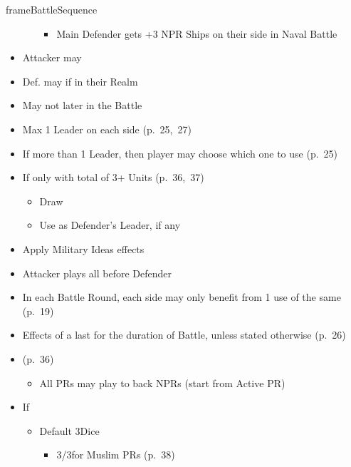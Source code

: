 \documentclass[10pt]{article}
\begin{document}
\begin{dynamiccontents*}{frameBattleSequence}
\begin{multicols}{3}
\begin{itemize}
\begin{itemize}
{				\begin{itemize}
					\item Main Defender gets +3 NPR Ships on their side in Naval Battle
				\end{itemize}
				}
			\end{itemize}
			\item Attacker may 
			\item Def. may  if in their Realm
			\item May not  later in the Battle
			\item Max 1 Leader on each side (p.~25,~27)
			\item If more than 1 Leader, then player may choose which one to use (p.~25)
			\item If only  with total of 3+ Units (p.~36,~37)
			\begin{itemize}
				\item Draw \milcard
				\item Use as Defender's Leader, if any
			\end{itemize}
			\item Apply Military Ideas effects
		\end{itemize}
		\begin{itemize}
			\item Attacker plays all \battleactions before Defender
			\item In each Battle Round, each side may only benefit from 1 use of the same \battleaction (p.~19)
			\item Effects of a \battleaction last for the duration of Battle, unless stated otherwise (p.~26)
			\item {} (p.~36)
			\begin{itemize}
				\item All PRs may play \battleactions to back NPRs (start from Active PR)
			\end{itemize}
		\end{itemize}
		\begin{itemize}
			\item If 
			\begin{itemize}
				\item Default 3\infantry Dice
				\begin{itemize}
					\item 3\infantry/3\cavalry for Muslim PRs (p.~38)

\end{itemize}
\end{itemize}
\end{itemize}
\end{multicols}
\end{dynamiccontents*}
\end{document}
